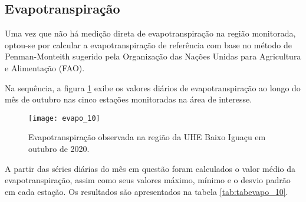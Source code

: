 \documentclass[a4paper,12pt]{article}
\begin{document}
    
    \newpage
     
                   \subsection{Evapotranspiração }
                   
                   \hspace{0.5cm} Uma vez que não há medição direta de evapotranspiração na região monitorada, optou-se por calcular a
                   evapotranspiração de referência com base no método de Penman-Monteith sugerido pela 
                   Organização das Nações Unidas para Agricultura e Alimentação (FAO). 
                   
                   Na sequência, a figura \ref{fig:figevapo_10} exibe os valores diários de evapotranspiração ao longo do mês de outubro nas cinco estações
                   monitoradas na área de interesse.
                       
    

    \begin{figure}[!htb]
    \texttt{[image: evapo\_10]}
    \caption{Evapotranspiração observada na região da UHE Baixo Iguaçu em outubro de 2020.}
    \label{fig:figevapo_10}
    \end{figure}

    A partir das séries diárias do mês em questão foram calculados o valor médio da evapotranspiração, assim como seus valores máximo, mínimo e
    o desvio padrão em cada estação. Os resultados são apresentados na tabela \ref{tab:tabevapo_10}.
    
\end{document}
